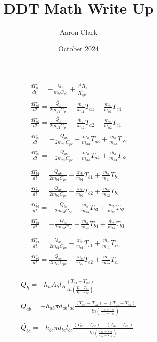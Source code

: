 \documentclass[16pt]{article}
\title{DDT Math Write Up}
\author{Aaron Clark}
\date{October 2024}
\begin{document}
\maketitle
\Large
\pagebreak

\huge
\[\begin{matrix}
    \frac{dT_{h}}{dt}=-\frac{\dot{Q_{h}}}{m_{h}C_{ph}}+\frac{V^2R_{h}}{R_{sys}^2}
    \\
    \frac{dT_{a1}}{dt}=\frac{\dot{Q_{h}}}{2m_{a1}C_{pc}}-\frac{\dot{m_a}}{m_{a1}}T_{a1}+\frac{\dot{m_a}}{m_{a1}}T_{a4}\\
    \frac{dT_{a2}}{dt}=\frac{\dot{Q_{h}}}{2m_{a2}C_{pc}}-\frac{\dot{m_a}}{m_{a2}}T_{a2}+\frac{\dot{m_a}}{m_{a2}}T_{a1}\\
    \frac{dT_{a3}}{dt}=-\frac{\dot{Q_{ab}}}{2m_{a3}C_{pc}}-\frac{\dot{m_a}}{m_{a3}}T_{a3}+\frac{\dot{m_a}}{m_{a3}}T_{a2}\\
    \frac{dT_{a4}}{dt}=-\frac{\dot{Q_{ab}}}{2m_{a4}C_{pc}}-\frac{\dot{m_a}}{m_{a4}}T_{a4}+\frac{\dot{m_a}}{m_{a4}}T_{a3}\\
    \\
    \frac{dT_{b1}}{dt}=\frac{\dot{Q_{ab}}}{2m_{b1}C_{pc}}-\frac{\dot{m_b}}{m_{b1}}T_{b1}+\frac{\dot{m_b}}{m_{b1}}T_{b4}\\
    \frac{dT_{b2}}{dt}=\frac{\dot{Q_{ab}}}{2m_{b2}C_{pc}}-\frac{\dot{m_b}}{m_{b2}}T_{b2}+\frac{\dot{m_b}}{m_{b2}}T_{b1}\\
    \frac{dT_{b3}}{dt}=-\frac{\dot{Q_{bc}}}{2m_{b3}C_{pc}}-\frac{\dot{m_b}}{m_{b3}}T_{b3}+\frac{\dot{m_b}}{m_{b3}}T_{b2}\\
    \frac{dT_{b4}}{dt}=-\frac{\dot{Q_{bc}}}{2m_{b4}C_{pc}}-\frac{\dot{m_b}}{m_{b4}}T_{b4}+\frac{\dot{m_b}}{m_{b4}}T_{b3}\\
    \\
    \frac{dT_{c1}}{dt}=\frac{\dot{Q_{bc}}}{2m_{c1}C_{pc}}-\frac{\dot{m_c}}{m_{c1}}T_{c1}+\frac{\dot{m_c}}{m_{c1}}T_{in}\\
    \frac{dT_{c2}}{dt}=\frac{\dot{Q_{bc}}}{2m_{c2}C_{pc}}-\frac{\dot{m_c}}{m_{c2}}T_{c2}+\frac{\dot{m_c}}{m_{c2}}T_{c1}\\
\end{matrix}\]
\pagebreak

\[\begin{matrix}
    \dot{Q_{h}}=-h_{h}A_{h}l_{H}\frac{(T_{a1}-T_{a2})}{ln(\frac{T_{h}-T_{a1}}{T_{h}-T_{a2}})}\\
    \\
    \dot{Q_{ab}}=-h_{ab}\pi d_{ab}l_{ab}\frac{(T_{a3}-T_{b2})-(T_{a4}-T_{b1})}{ln(\frac{T_{a3}-T_{b2}}{T_{a4}-T_{b1}})}\\
    \\
    \dot{Q_{bc}}=-h_{bc}\pi d_{bc}l_{bc}\frac{(T_{b3}-T_{c2})-(T_{b4}-T_{c1})}{ln(\frac{T_{b3}-T_{c2}}{T_{b4}-T_{c1}})}\\
\end{matrix}\]
\end{document}
